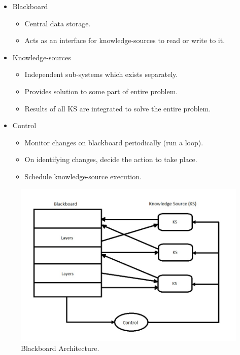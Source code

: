 \documentclass{article}
\begin{document}
\begin{itemize}

\item Blackboard
\begin{itemize}
\item Central data storage.
\item Acts as an interface for knowledge-sources to read or write to it.
\end{itemize}

\item Knowledge-sources
\begin{itemize}
\item Independent sub-systems which exists separately.
\item Provides solution to some part of entire problem.
\item Results of all KS are integrated to solve the entire problem.
\end{itemize}

\item Control
\begin{itemize}
\item Monitor changes on blackboard periodically (run a loop).
\item On identifying changes, decide the action to take place.
\item Schedule knowledge-source execution.
\end{itemize}

\end{itemize}

\begin{figure}[h]
\centering
\includegraphics[scale=0.3]{bb.jpg}
\caption{Blackboard Architecture.}
\label{fig_bb}
\end{figure}
	
\end{document}
